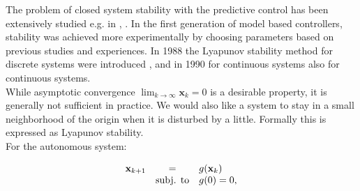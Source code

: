     	The problem of closed system stability with the predictive control has been extensively studied e.g. in \cite{mayne2000constrained}, \cite{grieder2005stabilizing}. In the first generation of model based controllers, stability was achieved more experimentally by choosing parameters based on previous studies and experiences. In 1988 the Lyapunov stability method for discrete systems were introduced \cite{keerthi1988optimal}, and in 1990 for continuous systems \cite{mayne1990receding} also for continuous systems. \\
    While asymptotic convergence $\lim_{k\rightarrow\infty}\textbf{x}_k=0$ is a desirable property, it is generally not sufficient in practice. We would also like a system to stay in a small neighborhood of the origin when it is disturbed by a little. Formally this is expressed as Lyapunov stability.\\
    For the autonomous system:
    
    \begin{equation}
    \begin{array}{rcl}
            \textbf{x}_{k+1}&=&g(\textbf{x}_k)\\
            &\textnormal{subj. to}&g(0)=0,
        \end{array}
        \label{BASICMPC:equ:autonom_system}
    \end{equation}
    
